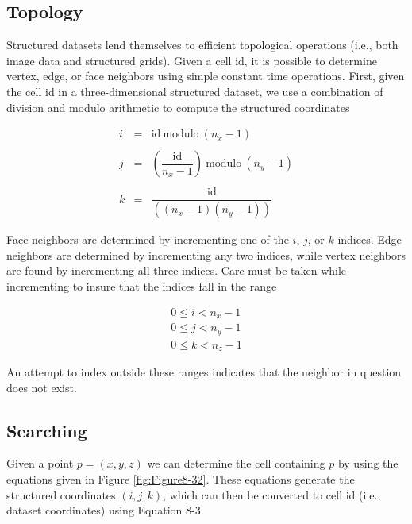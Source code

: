 \subsection{Topology}

Structured datasets lend themselves to efficient topological operations (i.e., both image data and structured grids). Given a cell id, it is possible to determine vertex, edge, or face neighbors using simple constant time operations. First, given the cell id in a three-dimensional structured dataset, we use a combination of division and modulo arithmetic to compute the structured coordinates

\begin{equation}\label{eq:8.29}
\begin{array}{lll}
i &=& \text{id}\ \text{modulo}\ (n_x - 1) \\ \\
j &=& \left( \dfrac{\text{id}}{n_x - 1} \right)\ \text{modulo}\ (n_y - 1) \\ \\
k &=& \dfrac{\text{id}}{\left((n_x - 1)(n_y - 1)\right)}
\end{array}
\end{equation}

Face neighbors are determined by incrementing one of the $i$, $j$, or $k$ indices. Edge neighbors are determined by incrementing any two indices, while vertex neighbors are found by incrementing all three indices. Care must be taken while incrementing to insure that the indices fall in the range

\begin{equation}\label{eq:8.30}
\begin{array}{l}
0 \leq i < n_x - 1 \\
0 \leq j < n_y - 1 \\
0 \leq k < n_z - 1
\end{array}
\end{equation}

An attempt to index outside these ranges indicates that the neighbor in question does not exist.

\subsection{Searching}
\label{subsec:searching}

Given a point $p = (x, y, z)$ we can determine the cell containing $p$ by using the equations given in Figure \ref{fig:Figure8-32}. These equations generate the structured coordinates $(i, j, k)$, which can then be converted to cell id (i.e., dataset coordinates) using Equation 8-3.

